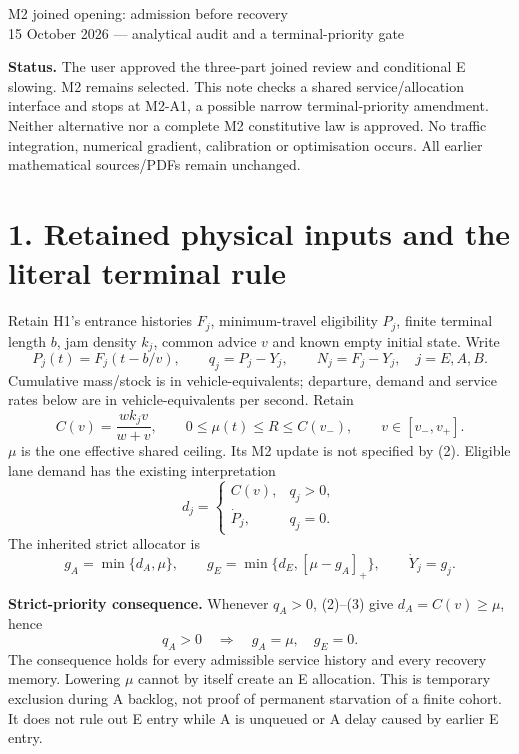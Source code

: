 \documentclass[11pt,a4paper]{article}
\newcommand{\pos}[1]{[#1]_+}
\begin{document}
\begin{center}
{\Large M2 joined opening: admission before recovery}\\[4pt]
15 October 2026 --- analytical audit and a terminal-priority gate
\end{center}

\textbf{Status.} The user approved the three-part joined review and conditional
E slowing. M2 remains selected. This note checks a shared service/allocation
interface and stops at M2-A1, a possible narrow terminal-priority amendment.
Neither alternative nor a complete M2 constitutive law is approved. No
traffic integration, numerical gradient, calibration or optimisation occurs.
All earlier mathematical sources/PDFs remain unchanged.

\section*{1. Retained physical inputs and the literal terminal rule}

Retain H1's entrance histories $F_j$, minimum-travel eligibility $P_j$,
finite terminal length $b$, jam density $k_j$, common advice $v$ and known
empty initial state. Write
\begin{equation}
 P_j(t)=F_j(t-b/v),\qquad q_j=P_j-Y_j,\qquad N_j=F_j-Y_j,
 \quad j=E,A,B. \tag{1}
\end{equation}
Cumulative mass/stock is in vehicle-equivalents; departure, demand and
service rates below are in vehicle-equivalents per second. Retain
\begin{equation}
 C(v)=\frac{wk_jv}{w+v},\qquad 0\leq\mu(t)\leq R\leq C(v_-),
 \qquad v\in[v_-,v_+]. \tag{2}
\end{equation}
$\mu$ is the one effective shared ceiling. Its M2 update is not specified
by (2). Eligible lane demand has the existing interpretation
\begin{equation}
 d_j=\begin{cases} C(v),&q_j>0,\\ \dot P_j,&q_j=0.\end{cases}
 \tag{3}
\end{equation}
The inherited strict allocator is
\begin{equation}
 g_A=\min\{d_A,\mu\},\qquad
 g_E=\min\{d_E,\pos{\mu-g_A}\},\qquad \dot Y_j=g_j. \tag{4}
\end{equation}

\textbf{Strict-priority consequence.} Whenever $q_A>0$, (2)--(3) give
$d_A=C(v)\geq\mu$, hence
\begin{equation}
 q_A>0\quad\Longrightarrow\quad g_A=\mu,\quad g_E=0. \tag{5}
\end{equation}
The consequence holds for every admissible service history and every
recovery memory. Lowering $\mu$ cannot by itself create an E allocation.
This is temporary exclusion during A backlog, not proof of permanent
starvation of a finite cohort. It does not rule out E entry while A is
unqueued or A delay caused by earlier E entry.
\end{document}
